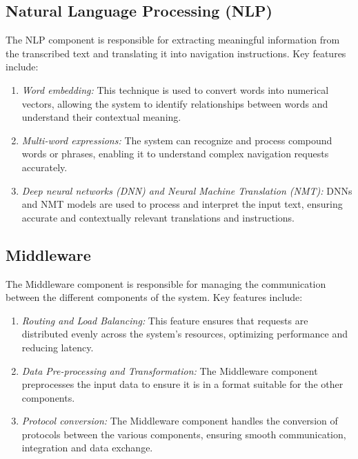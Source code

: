 \documentclass{epsrc}
\begin{document}
\subsection{Natural Language Processing (NLP)}
The NLP component is responsible for extracting meaningful information from the transcribed text and translating it into navigation instructions. Key features include:
\begin{enumerate}
    \item {\em Word embedding:} This technique is used to convert words into numerical vectors, allowing the system to identify relationships between words and understand their contextual meaning.\cite{7995777}
    \item {\em Multi-word expressions:} The system can recognize and process compound words or phrases, enabling it to understand complex navigation requests accurately.
    \item {\em Deep neural networks (DNN) and Neural Machine Translation (NMT):} DNNs and NMT models are used to process and interpret the input text, ensuring accurate and contextually relevant translations and instructions.\cite{7995777}
\end{enumerate}
\vspace{5pt}


\subsection{Middleware}
The Middleware component is responsible for managing the communication between the different components of the system. Key features include:
\begin{enumerate}
    \item {\em Routing and Load Balancing:} This feature ensures that requests are distributed evenly across the system's resources, optimizing performance and reducing latency.
    \item {\em Data Pre-processing and Transformation:} The Middleware component preprocesses the input data to ensure it is in a format suitable for the other components.
    \item {\em Protocol conversion:} The Middleware component handles the conversion of protocols between the various components, ensuring smooth communication, integration and data exchange.
\end{enumerate}
\vspace{5pt}
\end{document}

